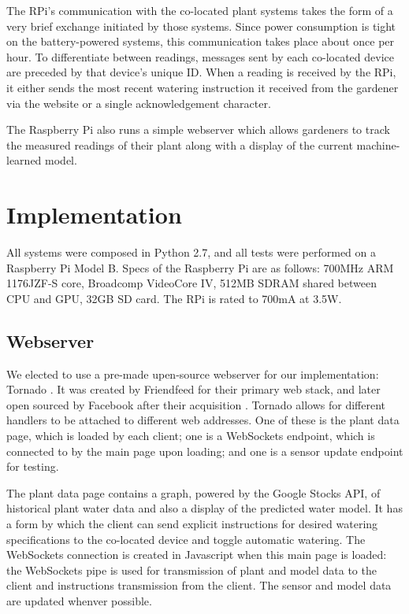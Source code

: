 \documentclass[a4paper]{acm_proc_article-sp}
\begin{document}
The RPi's communication with the co-located plant systems takes the form of a very brief exchange initiated by those systems.  Since power consumption is tight on the battery-powered systems, this communication takes place about once per hour.  To differentiate between readings, messages sent by each co-located device are preceded by that device's unique ID.  When a reading is received by the RPi, it either sends the most recent watering instruction it received from the gardener via the website or a single acknowledgement character.

The Raspberry Pi also runs a simple webserver which allows gardeners to track the measured readings of their plant along with a display of the current machine-learned model.

\section{Implementation}

All systems were composed in Python 2.7, and all tests were performed on a Raspberry Pi Model B.  Specs of the Raspberry Pi are as follows: 700MHz ARM 1176JZF-S core, Broadcomp VideoCore IV, 512MB SDRAM shared between CPU and GPU, 32GB SD card.  The RPi is rated to 700mA at 3.5W.

\subsection{Webserver}

We elected to use a pre-made upen-source webserver for our implementation: Tornado \cite{}.  It was created by Friendfeed for their primary web stack, and later open sourced by Facebook after their acquisition \cite{}.  Tornado allows for different handlers to be attached to different web addresses.  One of these is the plant data page, which is loaded by each client; one is a WebSockets endpoint, which is connected to by the main page upon loading; and one is a sensor update endpoint for testing.

The plant data page contains a graph, powered by the Google Stocks API, of historical plant water data and also a display of the predicted water model.  It has a form by which the client can send explicit instructions for desired watering specifications to the co-located device and toggle automatic watering.  The WebSockets connection is created in Javascript when this main page is loaded: the WebSockets pipe is used for transmission of plant and model data to the client and instructions transmission from the client.  The sensor and model data are updated whenver possible.
\end{document}
